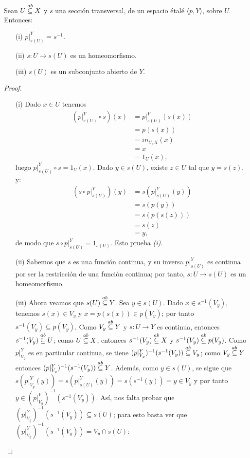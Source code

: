 \begin{Prop}
   Sean $U\stackrel{ab}{\subseteq} X$ y $s$ una sección transversal, de un espacio étalé $\langle p, Y\rangle$, sobre $U$. Entonces:
   \begin{itemize}
      \item[(i)] $p|^{Y}_{s(U)}=s^{-1}$.
      \item[(ii)] $s:U\to s(U)$ es un homeomorfismo.
      \item[(iii)] $s(U)$ es un subconjunto abierto de $Y$.
   \end{itemize}
\end{Prop}
\begin{proof}
   \begin{itemize}
      \item[(i)] Dado $x\in U$ tenemos
         $$
         \begin{aligned}
            (p|^Y_{s(U)}\circ s)(x)&=p|^Y_{s(U)}(s(x))\\
                                   &=p(s(x))\\
                                   &=in_{U,X}(x)\\
                                   &=x\\
                                   &=1_U(x),
         \end{aligned}
         $$
         luego $p|^Y_{s(U)}\circ s=1_U(x)$. Dado $y\in s(U)$, existe $z\in U$ tal que $y=s(z)$, y:
         $$
         \begin{aligned}
            (s\circ p|^Y_{s(U)})(y)&=s(p|^Y_{s(U)}(y))\\
                                  &=s(p(y))\\
                                  &=s(p(s(z)))\\
                                  &=s(z)\\
                                  &=y,
         \end{aligned}
         $$
         de modo que $s\circ p|^{Y}_{s(U)}=1_{s(U)}$. Esto prueba \textit{(i)}.
      \item[(ii)] Sabemos que $s$ es una función continua, y su inversa $p|^Y_{s(U)}$ es continua por ser la restricción de una función continua; por tanto, $s:U\to s(U)$ es un homeomorfismo.
   \item[(iii)] Ahora veamos que $s(U)\stackrel{ab}{\subseteq} Y$. Sea $y\in s(U)$. Dado $x\in s^{-1}(V_y)$, tenemos $s(x)\in V_y$ y $x=p(s(x))\in p(V_y)$; por tanto $s^{-1}(V_y)\subseteq p(V_y)$. Como $V_y\stackrel{ab}{\subseteq} Y$ y $s:U\to Y$ es continua, entonces $s^{-1}(V_y)\stackrel{ab}{\subseteq} U$; como $U\stackrel{ab}{\subseteq} X$, entonces $s^{-1}(V_y)\stackrel{ab}{\subseteq} X$ y $s^{-1}(V_y)\stackrel{ab}{\subseteq} p(V_y)$. Como $p|^Y_{V_y}$ es en particular continua, se tiene $(p|^Y_{V_y})^{-1}(s^{-1}(V_y))\stackrel{ab}{\subseteq} V_y$; como $V_y\stackrel{ab}{\subseteq} Y$ entonces $(p|^Y_{V_y})^{-1}(s^{-1}(V_y))\stackrel{ab}{\subseteq} Y$. Además, como $y\in s(U)$, se sigue que $s(p|^Y_{V_y}(y))=s(p|^Y_{s(U)}(y))=s(s^{-1}(y))=y\in V_y$ y por tanto $y\in (p|^Y_{V_y})^{-1}(s^{-1}(V_y))$. Así, nos falta probar que $(p|^Y_{V_y})^{-1}(s^{-1}(V_y))\subseteq s(U)$; para esto basta ver que $(p|^Y_{V_y})^{-1}(s^{-1}(V_y))=V_y\cap s(U)$:

\end{itemize}
\end{proof}
